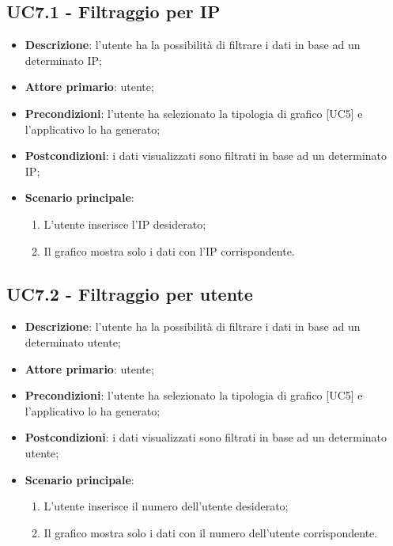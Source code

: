 \subsection{UC7.1 - Filtraggio per IP}
\begin{itemize}
  \item \textbf{Descrizione}: l'utente ha la possibilità di filtrare i dati in base ad un determinato IP;
  \item \textbf{Attore primario}: utente;
  \item \textbf{Precondizioni}: l'utente ha selezionato la tipologia di grafico [UC5] e l'applicativo lo ha generato;
  \item \textbf{Postcondizioni}: i dati visualizzati sono filtrati in base ad un determinato IP;
  \item \textbf{Scenario principale}:
    \begin{enumerate}
      \item L'utente inserisce l'IP desiderato;
      \item Il grafico mostra solo i dati con l'IP corrispondente.
    \end{enumerate}
\end{itemize}

\subsection{UC7.2 - Filtraggio per utente}
\begin{itemize}
  \item \textbf{Descrizione}: l'utente ha la possibilità di filtrare i dati in base ad un determinato utente;
  \item \textbf{Attore primario}: utente;
  \item \textbf{Precondizioni}: l'utente ha selezionato la tipologia di grafico [UC5] e l'applicativo lo ha generato;
  \item \textbf{Postcondizioni}: i dati visualizzati sono filtrati in base ad un determinato utente;
  \item \textbf{Scenario principale}:
    \begin{enumerate}
      \item L'utente inserisce il numero dell'utente desiderato;
      \item Il grafico mostra solo i dati con il numero dell'utente corrispondente.
    \end{enumerate}
\end{itemize}

